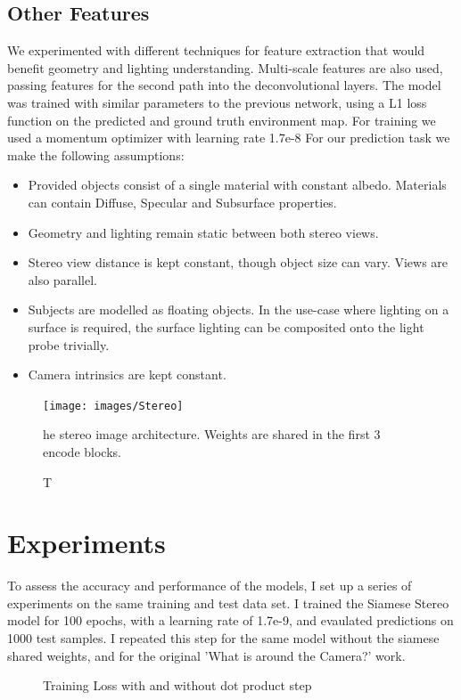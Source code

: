 \documentclass[ %
                    author={Gavin Parker},
                supervisor={Dr. Neill Campbell},
                    degree={MEng},
                     title={Deep Siamese Networks for Illumination Estimation from Stereo Images},
                  subtitle={},
                      type={research},
                      year={2018} ]{dissertation}
\begin{document}
\subsection{Other Features}
We experimented with different techniques for feature extraction that would benefit geometry and lighting understanding. Multi-scale features are also used, passing features for the second path into the deconvolutional layers. The model was trained with similar parameters to the previous network, using a L1 loss function on the predicted and ground truth environment map. For training we used a momentum optimizer with learning rate 1.7e-8
\newline
{}
For our prediction task we make the following assumptions:
\begin{itemize}
\item Provided objects consist of a single material with constant albedo. Materials can contain Diffuse, Specular and Subsurface properties.
\item Geometry and lighting remain static between both stereo views.
\item Stereo view distance is kept constant, though object size can vary. Views are also parallel.
\item Subjects are modelled as floating objects. In the use-case where lighting on a surface is required, the surface lighting can be composited onto the light probe trivially.
\item Camera intrinsics are kept constant.
\end{itemize}

\begin{figure}
\centering
\texttt{[image: images/Stereo]}
\caption The stereo image architecture. Weights are shared in the first 3 encode blocks.
\end{figure}

\section{Experiments}
To assess the accuracy and performance of the models, I set up a series of experiments on the same training and test data set. I trained the Siamese Stereo model for 100 epochs, with a learning rate of 1.7e-9, and evaulated predictions on 1000 test samples. I repeated this step for the same model without the siamese shared weights, and for the original 'What is around the Camera?' work.

\begin{figure}
\newlength\figureheight
\newlength\figurewidth
\setlength\figureheight{8cm}
\setlength\figurewidth{12cm}
\centering



\caption{Training Loss with and without dot product step}
\end{figure}
\end{document}
